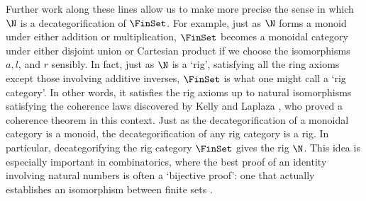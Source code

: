 Further work along these lines allow us to make more precise the sense
in which $\N$ is a decategorification of $\FinSet$.  For example, just
as $\N$ forms a monoid under either addition or multiplication,
$\FinSet$ becomes a monoidal category under either disjoint union or
Cartesian product if we choose the isomorphisms $a,l$, and $r$
sensibly.  In fact, just as $\N$ is a `rig', satisfying all the ring
axioms except those involving additive inverses, $\FinSet$ is what one
might call a `rig category'.  In other words, it satisfies the rig
axioms up to natural isomorphisms satisfying the coherence laws
discovered by Kelly \cite{Kelly} and Laplaza \cite{Laplaza}, who proved
a coherence theorem in this context.  Just as the decategorification of
a monoidal category is a monoid, the decategorification of any rig
category is a rig.  In particular, decategorifying the rig category
$\FinSet$ gives the rig $\N$.  This idea is especially important in
combinatorics, where the best proof of an identity involving natural numbers
is often a `bijective proof': one that actually establishes an isomorphism
between finite sets \cite{Joyal,Rota}.


